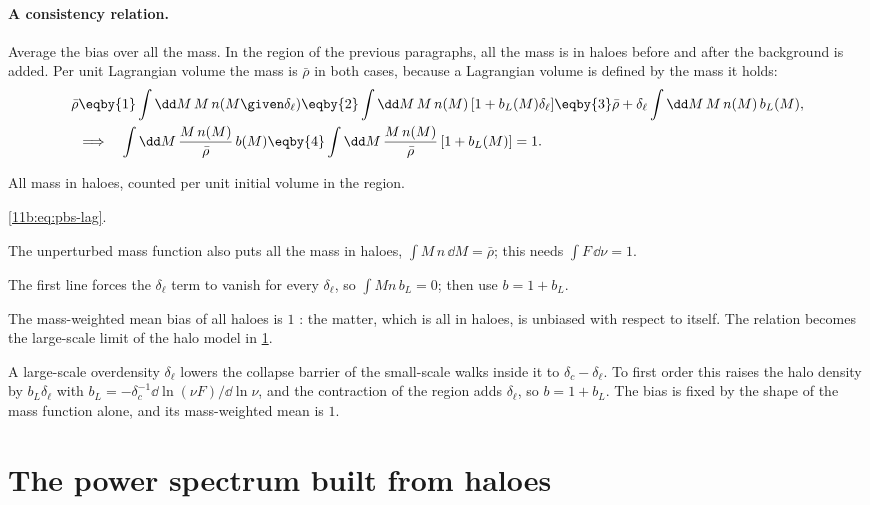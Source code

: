 \paragraph{A consistency relation.}
Average the bias over all the mass. In the region of the previous paragraphs, all
the mass is in haloes before and after the background is added. Per unit
Lagrangian volume the mass is $\bar\rho$ in both cases, because a Lagrangian
volume is defined by the mass it holds:
\begin{align}
  \bar\rho
  &\eqby{1}\int\dd M\,M\,n(M\given\delta_\ell)
   \eqby{2}\int\dd M\,M\,n(M)\,[1+b_L(M)\delta_\ell]
   \eqby{3}\bar\rho+\delta_\ell\int\dd M\,M\,n(M)\,b_L(M),\nonumber\\
  &\Longrightarrow\quad
  \int\dd M\,\frac{M\,n(M)}{\bar\rho}\,b(M)
  \eqby{4}\int\dd M\,\frac{M\,n(M)}{\bar\rho}\,[1+b_L(M)]=1 .
  \label{11b:eq:consistency}
\end{align}
\begin{explain}
  \item All mass in haloes, counted per unit initial volume in the region.
  \item \eqref{11b:eq:pbs-lag}.
  \item The unperturbed mass function also puts all the mass in haloes,
        $\int M\,n\,\dd M=\bar\rho$; this needs $\int F\,\dd\nu=1$.
  \item The first line forces the $\delta_\ell$ term to vanish for every
        $\delta_\ell$, so $\int Mn\,b_L=0$; then use $b=1+b_L$.
\end{explain}
The mass-weighted mean bias of all haloes is $1$ :
the matter, which is all in haloes, is unbiased with respect to itself. The relation
becomes the large-scale limit of the halo model in \cref{11b:sec:halomodel}.

\begin{keyidea}
A large-scale overdensity $\delta_\ell$ lowers the collapse barrier of the
small-scale walks inside it to $\delta_c-\delta_\ell$. To first order this raises
the halo density by $b_L\delta_\ell$ with $b_L=-\delta_c^{-1}\dd\ln(\nu F)/\dd\ln\nu$,
and the contraction of the region adds $\delta_\ell$, so $b=1+b_L$. The bias is
fixed by the shape of the mass function alone, and its mass-weighted mean is $1$.
\end{keyidea}
\section{The power spectrum built from haloes}
\label{11b:sec:halomodel}

